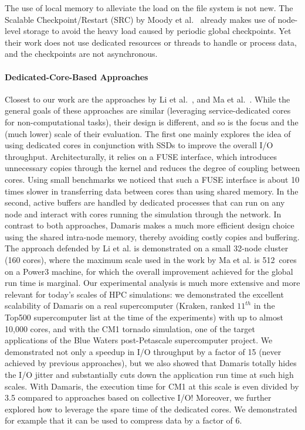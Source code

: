 The use of local memory to alleviate the load on the file system is not new.
The Scalable Checkpoint/Restart (SRC) by Moody et al.~\cite{moody2010design} already makes
use of node-level storage to avoid the heavy load caused by periodic global 
checkpoints. Yet their work does not use dedicated resources or threads to 
handle or process data, and the checkpoints are not asynchronous.

\paragraph{Dedicated-Core-Based Approaches}
Closest to our work are the approaches by Li et al.~\cite{li2010functional},
and Ma et al.~\cite{ma2006highlevel}. While the
general goals of these approaches are similar (leveraging
service-dedicated cores for non-computational tasks), their design is
different, and so is the focus and the (much lower) scale of their
evaluation. The first one 
mainly explores the idea of using dedicated cores in conjunction with
SSDs to improve the overall I/O
throughput. Architecturally, it relies on a FUSE interface, which
introduces unnecessary copies through the kernel and reduces the degree of coupling 
between cores. Using small benchmarks we noticed that such a FUSE interface is 
about 10 times slower in transferring data between cores than using shared memory.
In the second, active buffers are handled by
dedicated processes that can run on any node and interact with cores
running the simulation through the network.  In contrast to both
approaches, Damaris makes a much more efficient design choice using
the shared intra-node memory, thereby avoiding costly copies and
buffering. The approach defended by Li et al. is
demonstrated on a small 32-node cluster (160 cores), where the maximum
scale used in the work by Ma et al. is 512~cores on a 
Power3 machine, for which the overall improvement achieved for the global
run time is marginal. Our experimental analysis is much more extensive
and more relevant for today's scales of HPC simulations: we
demonstrated the excellent scalability of Damaris on a real
supercomputer (Kraken, ranked $11^{th}$ in the Top500 supercomputer list at the time
of the experiments) with up to almost 10,000 cores, and with the CM1 tornado simulation, one of the
target applications of the Blue Waters post-Petascale supercomputer project. 
We demonstrated not only a speedup in I/O throughput by a
factor of 15 (never achieved by previous approaches), but we also
showed that Damaris totally hides the I/O jitter and substantially cuts
down the application run time at such high scales. With 
Damaris, the execution time for CM1 at this scale is even divided by 3.5 
compared to approaches based on collective I/O!  
Moreover, we further explored how
to leverage the spare time of the dedicated cores. We demonstrated for example
that it can be used to compress data by a factor of 6.

